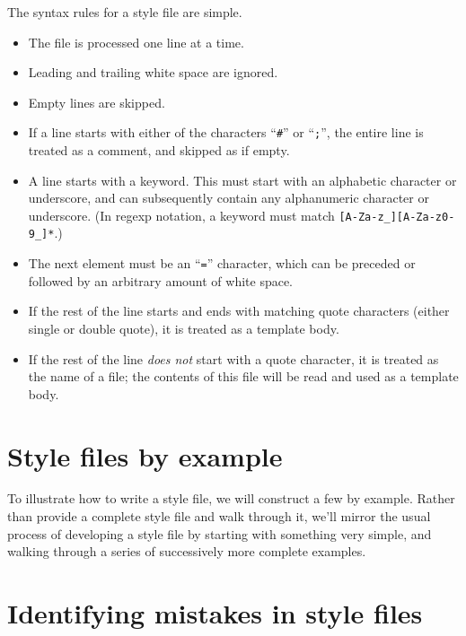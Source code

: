 {{The syntax rules for a style file are simple.

\begin{itemize}
\item The file is processed one line at a time.

\item Leading and trailing white space are ignored.

\item Empty lines are skipped.

\item If a line starts with either of the characters ``\texttt{\#}'' or
  ``\texttt{;}'', the entire line is treated as a comment, and skipped
  as if empty.

\item A line starts with a keyword.  This must start with an
  alphabetic character or underscore, and can subsequently contain any
  alphanumeric character or underscore.  (In regexp notation, a
  keyword must match \Verb+[A-Za-z_][A-Za-z0-9_]*+.)

\item The next element must be an ``\texttt{=}'' character, which can
  be preceded or followed by an arbitrary amount of white space.

\item If the rest of the line starts and ends with matching quote
  characters (either single or double quote), it is treated as a
  template body.

\item If the rest of the line \emph{does not} start with a quote
  character, it is treated as the name of a file; the contents of this
  file will be read and used as a template body.
\end{itemize}

\section{Style files by example}

To illustrate how to write a style file, we will construct a few by
example.  Rather than provide a complete style file and walk through
it, we'll mirror the usual process of developing a style file by
starting with something very simple, and walking through a series of
successively more complete examples.

\section{Identifying mistakes in style files}

}}
